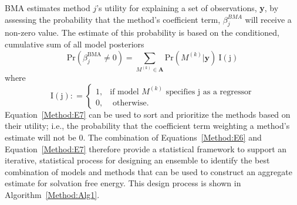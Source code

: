 \documentclass[journal=jpcbfk, manuscript=article]{achemso}
\newcommand{\+}[1]{\ensuremath{\mathbf{#1}}}
\begin{document}
BMA estimates method $j$'s utility for explaining a set of observations, \textbf{y}, by assessing the probability that the method's coefficient term, $\beta^{BMA}_j$ will receive a non-zero value.
The estimate of this probability is based on the conditioned, cumulative sum of all model posteriors
\begin{equation} \label{Method:E7} 
	\mathrm{Pr}(\beta_j^{\text{BMA}}\neq 0) =   \sum_{M^{(k)}\in\mathbf{A}} {\mathrm{Pr}}(M^{(k)} | \textbf{y}) \:{\mathrm{I(j)}}
\end{equation}
where
\begin{equation} \label{eq:bma-prob-neq0-ID}
	\mathrm{I(j)}: =
	\begin{cases} 
		1,&\text{if model $M^{(k)}$ specifies j as a regressor} \\
		0,&\text{ otherwise}.
	\end{cases}
\end{equation}
Equation~\ref{Method:E7} can be used to sort and prioritize the methods based on their utility; i.e., the probability that the coefficient term weighting a method's estimate will not be 0.
The combination of Equations~\ref{Method:E6} and Equation~\ref{Method:E7} therefore provide a statistical framework to support an iterative, statistical process for designing an ensemble 
to identify the best combination of models and methods that can be used to construct an aggregate estimate for solvation free energy.
This design process is shown in Algorithm~\ref{Method:Alg1}. 
\end{document}
